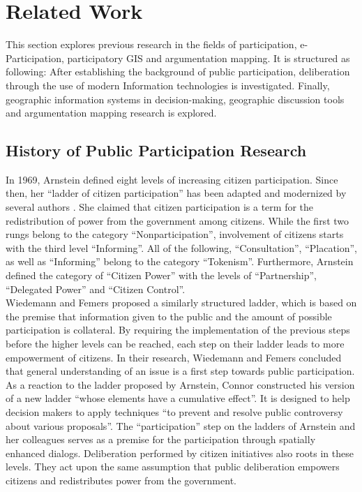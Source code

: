 \section{Related Work}
\label{chap:related_work}
This section explores previous research in the fields of participation, e-Participation, participatory GIS and argumentation mapping. It is structured as following: After establishing the background of public participation, deliberation through the use of modern Information technologies is investigated. Finally, geographic information systems in decision-making, geographic discussion tools and argumentation mapping research is explored.

\subsection{History of Public Participation Research}
In 1969, Arnstein \cite{Arnstein1969_citizen_participation} defined eight levels of increasing citizen participation. Since then, her ``ladder of citizen participation'' has been adapted and modernized by several authors \cite{Connor1988_new_ladder,carver2003future,Collins2009_social_learning,you2009_participatory_map_based,Cai2009_spatial_annotation_deliberation,Macintosh2004_eParticipation_characterization,Schlossberg2005_PPGIS}. She claimed that citizen participation is a term for the redistribution of power from the government among citizens. While the first two rungs belong to the category ``Nonparticipation'', involvement of citizens starts with the third level ``Informing''. All of the following, ``Consultation'', ``Placation'', as well as ``Informing'' belong to the category ``Tokenism''. Furthermore, Arnstein defined the category of ``Citizen Power'' with the levels of ``Partnership'', ``Delegated Power'' and ``Citizen Control''.\\
Wiedemann and Femers \cite{Wiedemann1993355} proposed a similarly structured ladder, which is based on the premise that information given to the public and the amount of possible participation is collateral. By requiring the implementation of the previous steps before the higher levels can be reached, each step on their ladder leads to more empowerment of citizens. In their research, Wiedemann and Femers concluded that general understanding of an issue is a first step towards public participation.\\
As a reaction to the ladder proposed by Arnstein, Connor \cite{Connor1988_new_ladder} constructed his version of a new ladder ``whose elements have a cumulative effect''. It is designed to help decision makers to apply techniques ``to prevent and resolve public controversy about various proposals''. The ``participation'' step on the ladders of Arnstein and her colleagues serves as a premise for the participation through spatially enhanced dialogs. Deliberation performed by citizen initiatives also roots in these levels. They act upon the same assumption that public deliberation empowers citizens and redistributes power from the government.

